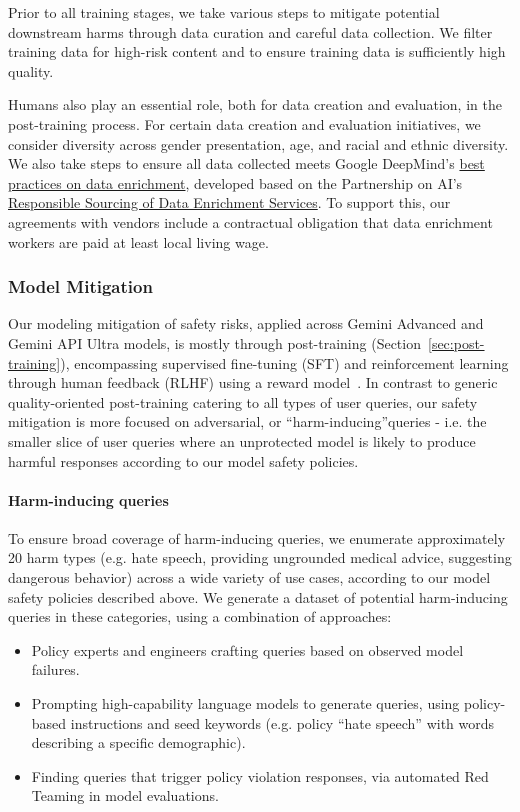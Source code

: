Prior to all training stages, we take various steps to mitigate potential downstream harms through data curation and careful data collection. We filter training data for high-risk content and to ensure training data is sufficiently high quality.

Humans also play an essential role, both for data creation and evaluation, in the post-training process. For certain data creation and evaluation initiatives, we consider diversity across gender presentation, age, and racial and ethnic diversity. We also take steps to ensure all data collected meets Google DeepMind’s \href{https://deepmind.google/discover/blog/best-practices-for-data-enrichment/}{best practices on data enrichment}, developed based on the Partnership on AI’s \href{https://partnershiponai.org/responsible-sourcing-considerations/}{Responsible Sourcing of Data Enrichment Services}. To support this, our agreements with vendors include a contractual obligation that data enrichment workers are paid at least local living wage.

\subsubsection{Model Mitigation}

Our modeling mitigation of safety risks, applied across Gemini Advanced and Gemini API Ultra models, is mostly through post-training (Section~\ref{sec:post-training}), encompassing supervised fine-tuning (SFT) and reinforcement learning through human feedback (RLHF) using a reward model~\citep{Bai2022-us}. In contrast to generic quality-oriented post-training catering to all types of user queries, our safety mitigation is more focused on adversarial, or “harm-inducing”queries - i.e. the smaller slice of user queries where an unprotected model is likely to produce harmful responses according to our model safety policies. 

\paragraph{Harm-inducing queries}

To ensure broad coverage of harm-inducing queries, we enumerate approximately 20 harm types (e.g. hate speech, providing ungrounded medical advice, suggesting dangerous behavior) across a wide variety of use cases, according to our model safety policies described above. We generate a dataset of potential harm-inducing queries in these categories, using a combination of approaches:
\begin{itemize}
    \item Policy experts and engineers crafting queries based on observed model failures.
    \item Prompting high-capability language models to generate queries, using policy-based instructions and seed keywords (e.g. policy “hate speech” with words describing a specific demographic).
    \item Finding queries that trigger policy violation responses, via automated Red Teaming in model evaluations.
\end{itemize}

